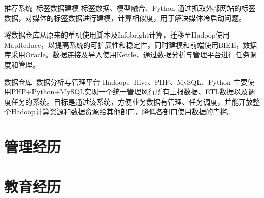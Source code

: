 \documentclass[11pt,a4paper]{moderncv}
\begin{document}
\vspace*{0.2\baselineskip}
{推荐系统--标签数据建模}
{标签数据、模型融合、Python}
{}{}
{通过抓取外部网站的标签数据，对媒体的标签数据进行建模，计算相似度，用于解决媒体冷启动问题。}

\vspace*{0.2\baselineskip}
{将数据仓库从原来的单机使用脚本及Infobright计算，迁移至Hadoop使用MapReduce，以提高系统的可扩展性和稳定性。同时建模和前端使用BIEE，数据库采用Oracle。数据连接及导入使用Kettle，通过数据分析与管理平台进行任务调度和管理。}

\vspace*{0.2\baselineskip}
{数据仓库--数据分析与管理平台}
{Hadoop、Hive、PHP、MySQL、Python}
{}{}
{主要使用PHP+Python+MySQL实现一个统一管理风行所有上报数据、ETL数据以及调度任务的系统。目标是通过该系统，方便业务数据有管理、任务调度，并能开放整个Hadoop计算资源和数据资源给其他部门，降低各部门使用数据的门槛。}

\section{管理经历}
\renewcommand{\baselinestretch}{1.2}
\renewcommand{\baselinestretch}{1.0}


\section{教育经历}
\end{document}
